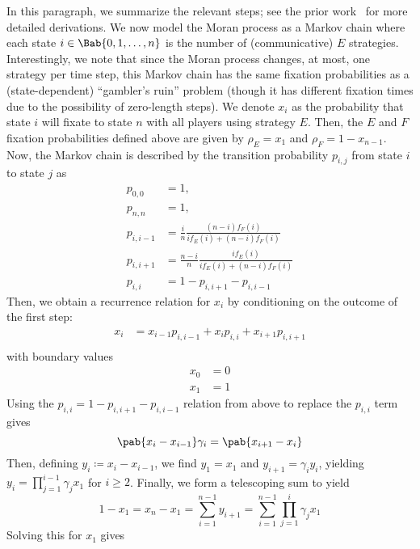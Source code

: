 In this paragraph, we summarize the relevant steps;
see the prior work~\citep{tripp2022evolutionary}
for more detailed derivations.
We now model the Moran process
as a Markov chain where each state $i \in \Bab{0,1,\ldots,n}$
is the number of (communicative) $E$ strategies.
Interestingly, we note that since the Moran process changes, at most,
one strategy per time step,
this Markov chain has the same fixation probabilities
as a (state-dependent) ``gambler's ruin'' problem
(though it has different fixation times due to the possibility of zero-length steps).
We denote $x_i$ as the probability that state $i$ will fixate
to state $n$ with all players using strategy $E$.
Then, the $E$ and $F$ fixation probabilities defined above are given by
$\rho_E = x_1$ and $\rho_F = 1 - x_{n-1}$.
Now, the Markov chain is described by the transition probability $p_{i,j}$
from state $i$ to state $j$ as
\begin{align*}
  p_{0,0} &= 1, \\
  p_{n,n} &= 1, \\
  p_{i,i-1} &= \frac{i}{n} \frac{(n-i) f_F(i)}{i f_E(i) + (n-i) f_F(i)} \\
  p_{i,i+1} &= \frac{n-i}{n} \frac{i f_E(i)}{i f_E(i) + (n-i) f_F(i)} \\
  p_{i,i} &= 1 - p_{i,i+1} - p_{i,i-1}
\end{align*}
Then, we obtain a recurrence relation for $x_i$ by conditioning
on the outcome of the first step:
\begin{align*}
  x_i &= x_{i-1} p_{i,i-1} + x_i p_{i,i} + x_{i+1} p_{i,i+1} \\
\end{align*}
with boundary values
\begin{align*}
  x_0 &= 0 \\
  x_1 &= 1
\end{align*}
Using the $p_{i,i} = 1 - p_{i,i+1} - p_{i,i-1}$ relation from above
to replace the $p_{i,i}$ term gives
\begin{equation*}
  \pab{x_i - x_{i-1}} \gamma_i = \pab{x_{i+1} - x_i}
\end{equation*}
Then, defining $y_i \coloneqq x_i - x_{i-1}$,
we find $y_1 = x_1$ and $y_{i+1} = \gamma_i y_i$,
yielding $y_i = \prod_{j=1}^{i-1} \gamma_j x_1$ for $i \ge 2$.
Finally, we form a telescoping sum to yield
\begin{equation*}
  1 - x_1 = x_n - x_1
  = \sum_{i=1}^{n-1} y_{i+1}
  = \sum_{i=1}^{n-1} \prod_{j=1}^i \gamma_j x_1
\end{equation*}
Solving this for $x_1$ gives
